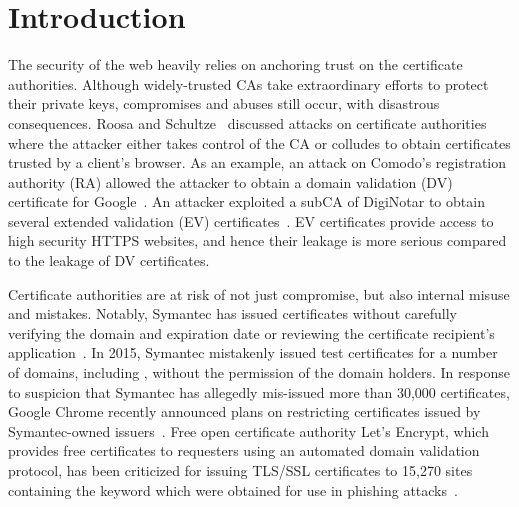 \section{Introduction}  \label{sec:introduction}

The security of the web heavily relies on anchoring trust on the certificate authorities. Although widely-trusted CAs take extraordinary efforts to protect their private keys, compromises and abuses still occur, with disastrous consequences. 
Roosa and Schultze~\cite{roosa2013trust} discussed attacks on certificate authorities where the attacker either takes control of the CA or colludes to obtain certificates trusted by a client's browser.  As an example, an attack on Comodo's registration authority (RA) allowed the attacker to obtain a domain validation (DV) certificate for Google~\cite{attack_from_iran}. An attacker exploited a subCA of DigiNotar  to obtain several extended validation (EV) certificates~\cite{diginotar_hack_highlights}. EV certificates provide access to high security HTTPS websites, and hence their leakage is more serious compared to the leakage of DV certificates. 

Certificate authorities are at risk of not just compromise, but also internal misuse and mistakes. Notably, Symantec has issued certificates without carefully verifying the domain and expiration date or reviewing the certificate recipient's application~\cite{symantec_issues_wiki}. In 2015, Symantec mistakenly issued test certificates for a number of domains, including , without the permission of the domain holders. In response to suspicion that Symantec has allegedly mis-issued more than 30,000 certificates, Google Chrome recently announced plans on restricting certificates issued by Symantec-owned issuers~\cite{google_takes_symantec}. Free open certificate authority 
Let's Encrypt, which provides free certificates to requesters using an automated domain validation protocol, has been criticized for issuing TLS/SSL certificates to 15,270 sites containing the keyword  which were obtained for use in phishing attacks~\cite{lets_encrypt_paypal}. %

